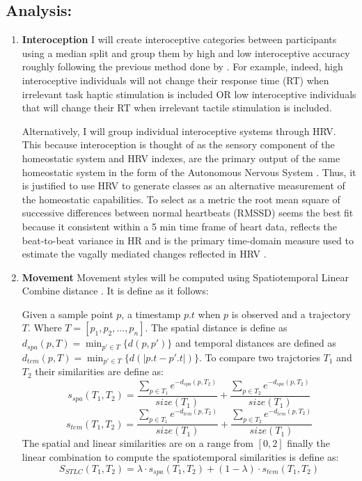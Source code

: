 \documentclass{article}
\begin{document}
\subsection{Analysis:} 
\begin{enumerate}
    \item \textbf{Interoception} I will create interoceptive categories between participants using a median split and group them by high and low interoceptive accuracy roughly following the previous method done by \citep{Tsakiris2011}. For example, indeed, high interoceptive individuals will not change their response time (RT) when irrelevant task haptic stimulation is included OR low interoceptive individuals that will change their RT when irrelevant tactile stimulation is included.
    
    Alternatively, I will group individual interoceptive systems through HRV. This because interoception is thought of as the sensory component of the homeostatic system and HRV indexes, are the primary output of the same homeostatic system in the form of the Autonomous Nervous System  \citep{Pinna2020}. Thus, it is justified to use HRV to generate classes as an alternative measurement of the homeostatic capabilities. To select as a metric the root mean square of successive differences between normal heartbeats (RMSSD) seems the best fit because it consistent within a 5 min time frame of heart data, reflects the beat-to-beat variance in HR and is the primary time-domain measure used to estimate the vagally mediated changes reflected in HRV \cite{Shaffer2017}.
    
    \item \textbf{Movement} Movement styles will be computed using Spatiotemporal Linear Combine distance \citep{Su2020}. It is define as it follows: 

    Given a sample point $p$, a timestamp $p.t$ when $p$ is observed and a trajectory $T$. Where $T = [p_1,p_2,...,p_n]$. The spatial distance is define as $d_{spa}(p,T)= \displaystyle \min_{p'\in T}\{d(p,p')\}$ and temporal distances are defined as $d_{tem}(p,T)= \displaystyle \min_{p'\in T}\{d(|p.t-p'.t|)\}$. To compare two trajctories $T_1$ and $T_2$ their similarities are define as:
    \begin{equation}
        s_{spa}(T_1,T_2)= \frac{\sum_{p\in T_1}e^{-d_{spa}(p,T_2)}}{size(T_1)}+\frac{\sum_{p\in T_2}e^{-d_{spa}(p,T_2)}}{size(T_1)}
    \end{equation}
    \begin{equation}
        s_{tem}(T_1,T_2)= \frac{\sum_{p\in T_1}e^{-d_{tem}(p,T_2)}}{size(T_1)}+\frac{\sum_{p\in T_2}e^{-d_{tem}(p,T_2)}}{size(T_1)}
    \end{equation}
    The spatial and linear similarities are on a range from $[0,2]$ finally the linear combination to compute the spatiotemporal similarities is define as: 
    \begin{equation}
        S_{STLC}(T_1,T_2)= \lambda \cdot s_{spa}(T_1,T_2) + (1-\lambda) \cdot s_{tem}(T_1,T_2)
    \end{equation}
    

\end{enumerate}
\end{document}
